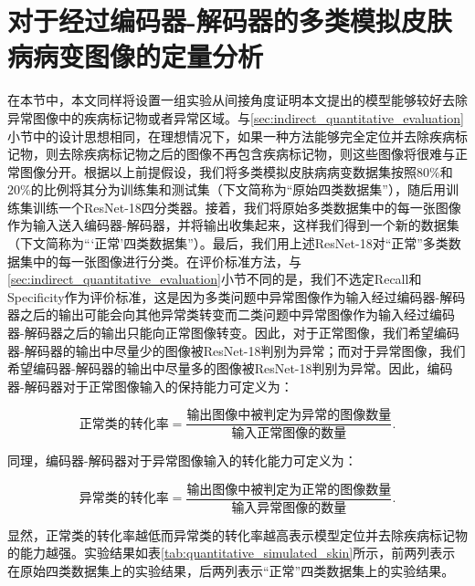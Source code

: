 \section{对于经过编码器-解码器的多类模拟皮肤病病变图像的定量分析}
在本节中，本文同样将设置一组实验从间接角度证明本文提出的模型能够较好去除异常图像中的疾病标记物或者异常区域。与\ref{sec:indirect_quantitative_evaluation}小节中的设计思想相同，在理想情况下，如果一种方法能够完全定位并去除疾病标记物，则去除疾病标记物之后的图像不再包含疾病标记物，则这些图像将很难与正常图像分开。根据以上前提假设，我们将多类模拟皮肤病病变数据集按照$80\%$和$20\%$的比例将其分为训练集和测试集（下文简称为“原始四类数据集”），随后用训练集训练一个ResNet-18四分类器。接着，我们将原始多类数据集中的每一张图像作为输入送入编码器-解码器，并将输出收集起来，这样我们得到一个新的数据集（下文简称为“‘正常’四类数据集”）。最后，我们用上述ResNet-18对“正常”多类数据集中的每一张图像进行分类。在评价标准方法，与\ref{sec:indirect_quantitative_evaluation}小节不同的是，我们不选定Recall和Specificity作为评价标准，这是因为多类问题中异常图像作为输入经过编码器-解码器之后的输出可能会向其他异常类转变而二类问题中异常图像作为输入经过编码器-解码器之后的输出只能向正常图像转变。因此，对于正常图像，我们希望编码器-解码器的输出中尽量少的图像被ResNet-18判别为异常；而对于异常图像，我们希望编码器-解码器的输出中尽量多的图像被ResNet-18判别为异常。因此，编码器-解码器对于正常图像输入的保持能力可定义为：

\begin{equation}\label{equ:normal_imgs_kep_rate}
\text{正常类的转化率}=\frac{\text{输出图像中被判定为异常的图像数量}}{\text{输入正常图像的数量}}.
\end{equation}

\noindent 同理，编码器-解码器对于异常图像输入的转化能力可定义为：

\begin{equation}\label{equ:lesion_imgs_converted_rate}
\text{异常类的转化率}=\frac{\text{输出图像中被判定为正常的图像数量}}{\text{输入异常图像的数量}}.
\end{equation}

\noindent 显然，正常类的转化率越低而异常类的转化率越高表示模型定位并去除疾病标记物的能力越强。实验结果如表\ref{tab:quantitative_simulated_skin}所示，前两列表示在原始四类数据集上的实验结果，后两列表示“正常”四类数据集上的实验结果。

